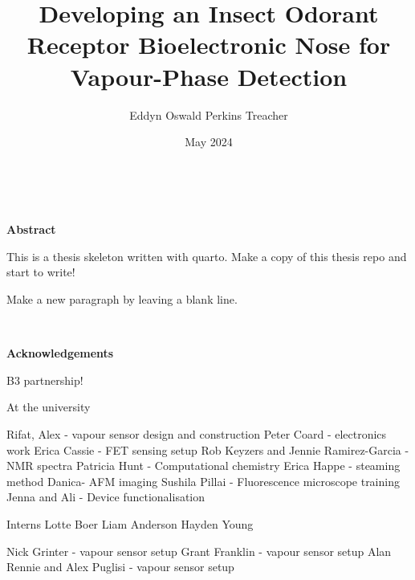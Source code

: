 \documentclass[
  a4paper,
]{scrbook}
\title{Developing an Insect Odorant Receptor Bioelectronic Nose for
Vapour-Phase Detection}
\author{Eddyn Oswald Perkins Treacher}
\date{May 2024}
\begin{document}
\frontmatter

\maketitle

\clearpage
\newpage
\thispagestyle{empty} %
\mbox{~}
\clearpage
\newpage


\begin{flushleft}
\huge\textbf{Abstract}
\end{flushleft}

\vspace*{\baselineskip}

This is a thesis skeleton written with quarto.
Make a copy of this thesis repo and start to write!

Make a new paragraph by leaving a blank line.

\clearpage
\newpage
\thispagestyle{empty} %
\mbox{~}
\clearpage
\newpage



\begin{flushleft}
\huge\textbf{Acknowledgements}
\end{flushleft}

\vspace*{\baselineskip}

B3 partnership!

At the university

Rifat, Alex - vapour sensor design and construction
Peter Coard - electronics work
Erica Cassie - FET sensing setup
Rob Keyzers and Jennie Ramirez-Garcia - NMR spectra
Patricia Hunt - Computational chemistry
Erica Happe - steaming method
Danica- AFM imaging
Sushila Pillai - Fluorescence microscope training
Jenna and Ali - Device functionalisation

Interns
Lotte Boer
Liam Anderson
Hayden Young

Nick Grinter - vapour sensor setup
Grant Franklin - vapour sensor setup
Alan Rennie and Alex Puglisi - vapour sensor setup
\end{document}
